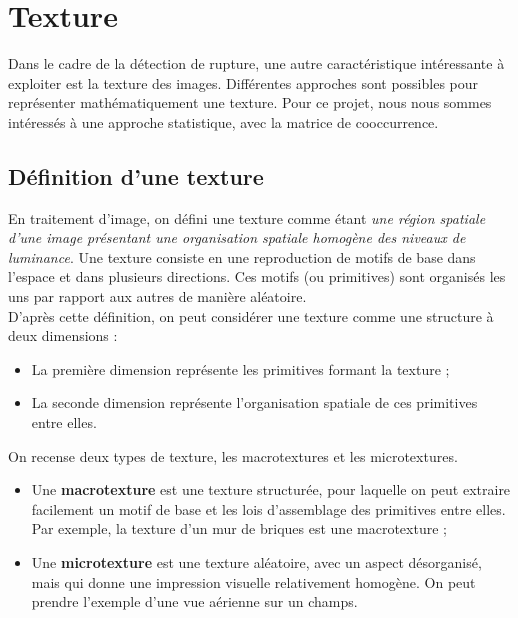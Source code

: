 \section{Texture}

Dans le cadre de la détection de rupture, une autre caractéristique intéressante à exploiter est la texture des images. Différentes approches sont possibles pour représenter mathématiquement une texture. Pour ce projet, nous nous sommes intéressés à une approche statistique, avec la matrice de cooccurrence.

\subsection{Définition d'une texture}

En traitement d'image, on défini une texture comme étant \textit{une région spatiale d'une image présentant une organisation spatiale homogène des niveaux de luminance}. Une texture consiste en une reproduction de motifs de base dans l'espace et dans plusieurs directions. Ces motifs (ou primitives) sont organisés les uns par rapport aux autres de manière aléatoire.\\

D'après cette définition, on peut considérer une texture comme une structure à deux dimensions :

\begin{itemize}
    \item La première dimension représente les primitives formant la texture ;
    \item La seconde dimension représente l'organisation spatiale de ces primitives entre elles.
\end{itemize}

On recense deux types de texture, les macrotextures et les microtextures.

\begin{itemize}
    \item Une \textbf{macrotexture} est une texture structurée, pour laquelle on peut extraire facilement un motif de base et les lois d'assemblage des primitives entre elles. Par exemple, la texture d'un mur de briques est une macrotexture ;
    \item Une \textbf{microtexture} est une texture aléatoire, avec un aspect désorganisé, mais qui donne une impression visuelle relativement homogène. On peut prendre l'exemple d'une vue aérienne sur un champs.
\end{itemize}

